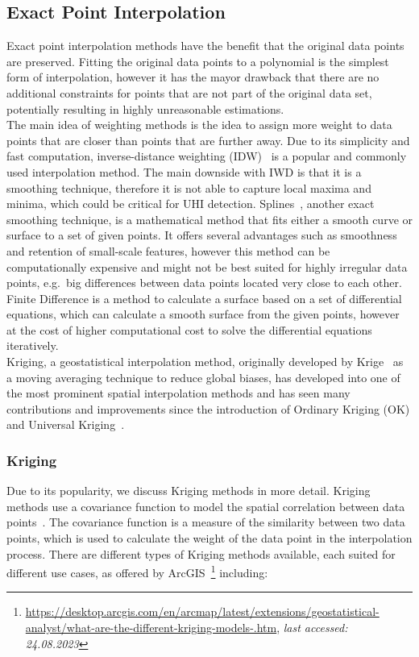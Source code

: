 \subsection{Exact Point Interpolation}

Exact point interpolation methods have the benefit that the original data points are preserved. Fitting the original data points to a polynomial is the simplest form of interpolation, however it has the mayor drawback that there are no additional constraints for points that are not part of the original data set, potentially resulting in highly unreasonable estimations.\\
The main idea of weighting methods is the idea to assign more weight to data points that are closer than points that are further away. Due to its simplicity and fast computation, inverse-distance weighting (IDW)~\cite{willmott1985small} is a popular and commonly used interpolation method. The main downside with IWD is that it is a smoothing technique, therefore it is not able to capture local maxima and minima, which could be critical for UHI detection. Splines~\cite{mitavs1988general}, another exact smoothing technique, is a mathematical method that fits either a smooth curve or surface to a set of given points. It offers several advantages such as smoothness and retention of small-scale features, however this method can be computationally expensive and might not be best suited for highly irregular data points, e.g.\ big differences between data points located very close to each other. Finite Difference is a method to calculate a surface based on a set of differential equations, which can calculate a smooth surface from the given points, however at the cost of higher computational cost to solve the differential equations iteratively.\\
Kriging, a geostatistical interpolation method, originally developed by Krige~\cite{krige1976review} as a moving averaging technique to reduce global biases, has developed into one of the most prominent spatial interpolation methods and has seen many contributions and improvements since the introduction of Ordinary Kriging (OK) and Universal Kriging~\cite{li2014spatial}.

\subsubsection{Kriging}

Due to its popularity, we discuss Kriging methods in more detail. Kriging methods use a covariance function to model the spatial correlation between data points~\cite{wackernagel2003multivariate}. The covariance function is a measure of the similarity between two data points, which is used to calculate the weight of the data point in the interpolation process. There are different types of Kriging methods available, each suited for different use cases, as offered by ArcGIS~\footnote{\url{https://desktop.arcgis.com/en/arcmap/latest/extensions/geostatistical-analyst/what-are-the-different-kriging-models-.htm}, \textit{last accessed: 24.08.2023}} including:


